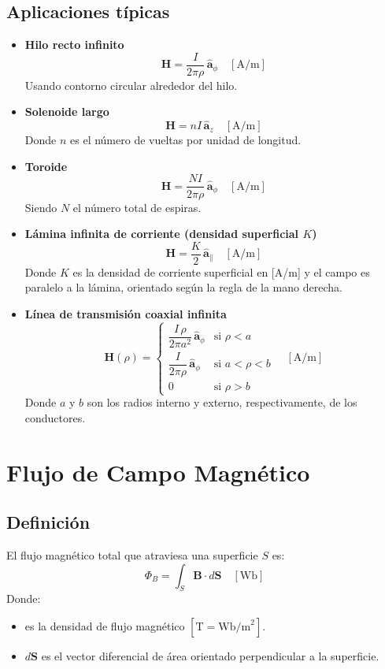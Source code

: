 \documentclass[11pt]{article}
\begin{document}
\subsection*{Aplicaciones típicas}
\begin{itemize}
  \item \textbf{Hilo recto infinito}  
        \[
        \mathbf{H} = \frac{I}{2\pi {\rho}}\,\hat{\boldsymbol{a}}_{\phi} \quad [\text{A/m}]
        \]
        Usando contorno circular alrededor del hilo.

  \item \textbf{Solenoide largo}  
        \[
        \mathbf{H} = nI\,\hat{\boldsymbol{a}}_{z} \quad [\text{A/m}]
        \]
        Donde \(n\) es el número de vueltas por unidad de longitud.

  \item \textbf{Toroide}  
        \[
        \mathbf{H} = \frac{NI}{2\pi {\rho}}\,\hat{\boldsymbol{a}}_{\phi} \quad [\text{A/m}]
        \]
        Siendo \(N\) el número total de espiras.

  \item \textbf{Lámina infinita de corriente (densidad superficial \(K\))}  
        \[
        \mathbf{H} = \frac{K}{2}\,\hat{\boldsymbol{a}}_{\parallel} \quad [\text{A/m}]
        \]
        Donde \(K\) es la densidad de corriente superficial en [A/m] y el campo es paralelo a la lámina, orientado según la regla de la mano derecha.

  \item \textbf{Línea de transmisión coaxial infinita}  
        \[
        \mathbf{H}({\rho}) = 
        \begin{cases}
        \dfrac{I\,{\rho}}{2\pi a^{2}}\,\hat{\boldsymbol{a}}_{\phi} & \text{si } {\rho} < a \\
        \dfrac{I}{2\pi {\rho}}\,\hat{\boldsymbol{a}}_{\phi} & \text{si } a < {\rho} < b \\
        0 & \text{si } {\rho} > b
        \end{cases}
        \quad [\text{A/m}]
        \]
        Donde \(a\) y \(b\) son los radios interno y externo, respectivamente, de los conductores.
\end{itemize}

\section{Flujo de Campo Magnético}
\subsection*{Definición}
El flujo magnético total que atraviesa una superficie \(S\) es:
\[
\Phi_{B} = \int_{S} \mathbf{B} \cdot d\mathbf{S}
\quad [\text{Wb}]
\]
Donde:
\begin{itemize}
  \item {} es la densidad de flujo magnético \([\text{T} = \text{Wb/m}^2]\).
  \item \(d\mathbf{S}\) es el vector diferencial de área orientado perpendicular a la superficie.
\end{itemize}
\end{document}
